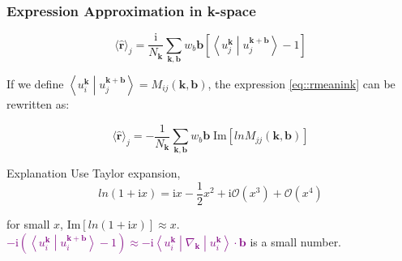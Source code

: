 \documentclass{beamer}
\begin{document}
  \begin{frame}
    \frametitle{Expression Approximation in k-space}
    \small
    \begin{equation*}
      \langle\widehat{\mathbf{r}}\rangle_j = \dfrac{\mathrm{i}}{N_\mathbf{k}}\sum_{\mathbf{k},\mathbf{b}}w_b\mathbf{b}\left[\left\langle{}u_j^{\mathbf{k}}\middle|u_j^{\mathbf{k}+\mathbf{b}}\right\rangle-1\right]
    \end{equation*}

    If we define \(\left\langle{}u_i^{\mathbf{k}}\middle|u_j^{\mathbf{k}+\mathbf{b}}\right\rangle = M_{ij}(\mathbf{k}, \mathbf{b})\), the expression \eqref{eq::rmeanink} can be rewritten as:
     
    \begin{equation}
        \langle\widehat{\mathbf{r}}\rangle_j = -\dfrac{1}{N_\mathbf{k}}\sum_{\mathbf{k},\mathbf{b}}w_b\mathbf{b}\;\mathrm{Im}[lnM_{jj}(\mathbf{k}, \mathbf{b})]
    \end{equation}

    \begin{block}{Explanation}
      Use Taylor expansion, 
      \begin{equation*}
        ln(1+\mathrm{i}x) = \mathrm{i}x - \frac{1}{2}x^2 + \mathrm{i}\mathcal{O}(x^3) + \mathcal{O}(x^4)
      \end{equation*}

      for small \(x\), \(\mathrm{Im}[ln(1+\mathrm{i}x)] \approx x\).\\[4pt]
      
      \textcolor{purple}{\(-\mathrm{i}\left(\left\langle{}u_i^{\mathbf{k}}\middle|u_i^{\mathbf{k}+\mathbf{b}}\right\rangle-1\right) \approx -\mathrm{i}\left\langle{}u_i^{\mathbf{k}}\middle|\nabla_{\mathbf{k}}\middle|u_i^{\mathbf{k}}\right\rangle\cdot\mathbf{b}\)} is a small number. 
    \end{block}

  \end{frame}
\end{document}
